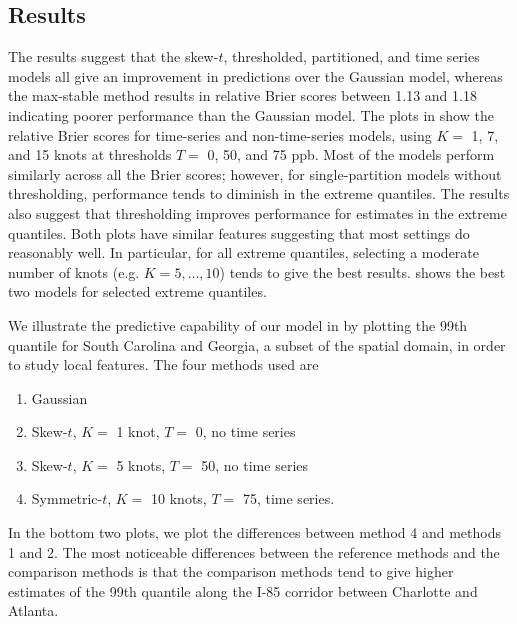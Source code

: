 \documentclass[useAMS,usenatbib,referee]{biom}
\begin{document}
\subsection{Results}\label{sts:results}
The results suggest that the skew-$t$, thresholded, partitioned, and time series models all give an improvement in predictions over the Gaussian model, whereas the max-stable method results in relative Brier scores between 1.13 and 1.18 indicating poorer performance than the Gaussian model.
The plots in  show the relative Brier scores for time-series and non-time-series models, using $K = $ 1, 7, and 15 knots at thresholds $T = $ 0, 50, and 75 ppb.
Most of the models perform similarly across all the Brier scores; however, for single-partition models without thresholding, performance tends to diminish in the extreme quantiles.
The results also suggest that thresholding improves performance for estimates in the extreme quantiles.
Both plots have similar features suggesting that most settings do reasonably well.
In particular, for all extreme quantiles, selecting a moderate number of knots (e.g. $K = 5, \ldots, 10$) tends to give the best results.
 shows the best two models for selected extreme quantiles.

We illustrate the predictive capability of our model in  by plotting the 99th quantile for South Carolina and Georgia, a subset of the spatial domain, in order to study local features.
The four methods used are
\begin{enumerate}[leftmargin=3em]
  \item Gaussian
  \item Skew-$t$, $K =$ 1 knot, $T = $ 0, no time series
  \item Skew-$t$, $K =$ 5 knots, $T = $ 50, no time series
  \item Symmetric-$t$, $K =$ 10 knots, $T = $ 75, time series.
\end{enumerate}
In the bottom two plots, we plot the differences between method 4 and methods 1 and 2.
The most noticeable differences between the reference methods and the comparison methods is that the comparison methods tend to give higher estimates of the 99th quantile along the I-85 corridor between Charlotte and Atlanta.
\end{document}
